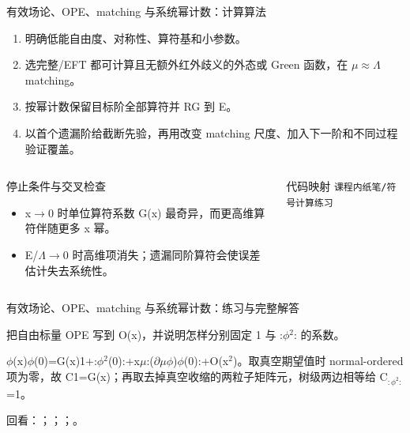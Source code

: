 \begin{frame}[t]{有效场论、OPE、matching 与系统幂计数：计算算法}
\footnotesize
{}\begin{enumerate}
\item 明确低能自由度、对称性、算符基和小参数。
\item 选完整/\allowbreak{}EFT 都可计算且无额外红外歧义的外态或 Green 函数，在 \ensuremath{\mu}\ensuremath{\approx}\ensuremath{\Lambda} matching。
\item 按幂计数保留目标阶全部算符并 RG 到 E。
\item 以首个遗漏阶给截断先验，再用改变 matching 尺度、加入下一阶和不同过程验证覆盖。
\end{enumerate}\begin{columns}[T,onlytextwidth]
\begin{block}{停止条件与交叉检查}\scriptsize\begin{itemize}
\item[\CheckMark] x\ensuremath{\rightarrow}0 时单位算符系数 G(x) 最奇异，而更高维算符伴随更多 x 幂。
\item[\CheckMark] E/\allowbreak{}\ensuremath{\Lambda}\ensuremath{\rightarrow}0 时高维项消失；遗漏同阶算符会使误差估计失去系统性。
\end{itemize}\end{block}
\begin{block}{代码映射}
\scriptsize \texttt{课程内纸笔/\allowbreak{}符号计算练习}
\end{block}\end{columns}\end{frame}

\begin{frame}[t]{有效场论、OPE、matching 与系统幂计数：练习与完整解答}
\footnotesize
\begin{block}{}把自由标量 OPE 写到 O(x)，并说明怎样分别固定 1 与 :\ensuremath{\phi}\ensuremath{^{2}}: 的系数。\end{block}
\begin{exampleblock}{}\ensuremath{\phi}(x)\ensuremath{\phi}(0)=G(x)1+:\ensuremath{\phi}\ensuremath{^{2}}(0):+x\ensuremath{\mu}:(\ensuremath{\partial}\ensuremath{\mu}\ensuremath{\phi})\ensuremath{\phi}(0):+O(x\ensuremath{^{2}})。取真空期望值时 normal-ordered 项为零，故 C1=G(x)；再取去掉真空收缩的两粒子矩阵元，树级两边相等给 C\ensuremath{_{:\phi^{2}:}}=1。\end{exampleblock}
\vfill
\scriptsize 回看：；；；。
\end{frame}

